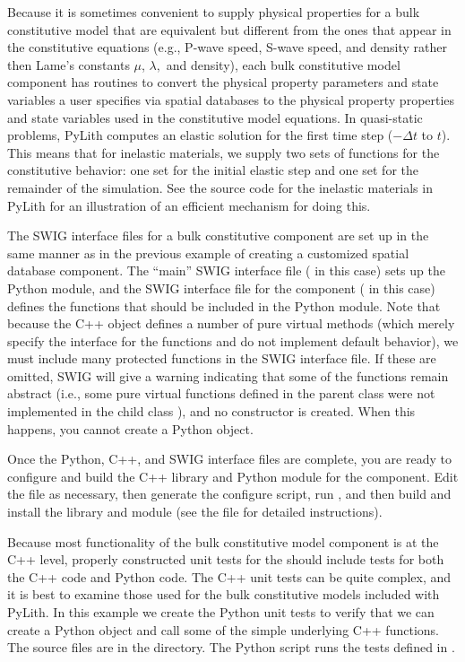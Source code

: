 Because it is sometimes convenient to supply physical properties for
a bulk constitutive model that are equivalent but different from the
ones that appear in the constitutive equations (e.g., P-wave speed,
S-wave speed, and density rather then Lame's constants $\mu$, $\lambda,$
and density), each bulk constitutive model component has routines
to convert the physical property parameters and state variables a
user specifies via spatial databases to the physical property properties
and state variables used in the constitutive model equations. In quasi-static
problems, PyLith computes an elastic solution for the first time step
($-\Delta t$ to $t$). This means that for inelastic materials, we
supply two sets of functions for the constitutive behavior: one set
for the initial elastic step and one set for the remainder of the
simulation. See the source code for the inelastic materials in PyLith
for an illustration of an efficient mechanism for doing this.

The SWIG interface files for a bulk constitutive component are set up
in the same manner as in the previous example of creating a customized
spatial database component. The ``main'' SWIG interface file
( in this case) sets up the Python
module, and the SWIG interface file for the component
( in this case) defines the functions
that should be included in the Python module. Note that because the
C++  object defines a number of pure virtual
methods (which merely specify the interface for the functions and do
not implement default behavior), we must include many protected
functions in the SWIG interface file. If these are omitted, SWIG will
give a warning indicating that some of the functions remain abstract
(i.e., some pure virtual functions defined in the parent class
 were not implemented in the child class
), and no constructor is created. When this
happens, you cannot create a  Python object.

Once the Python, C++, and SWIG interface files are complete, you are
ready to configure and build the C++ library and Python module for the
component. Edit the  file as necessary, then
generate the configure script, run , and then
build and install the library and module (see the 
file for detailed instructions).

Because most functionality of the bulk constitutive model component is
at the C++ level, properly constructed unit tests for the
 should include tests for both the C++ code and
Python code. The C++ unit tests can be quite complex, and it is best
to examine those used for the bulk constitutive models included with
PyLith. In this example we create the Python unit tests to verify that
we can create a  Python object and call some
of the simple underlying C++ functions.  The source files are in the
 directory.  The
 Python script runs the tests defined in
.

